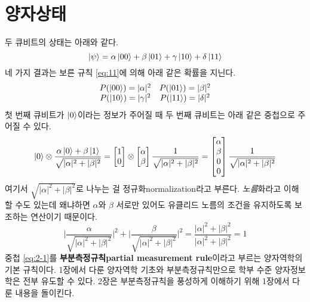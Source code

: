 \documentclass[a4paper,chapter,atbegshi]{oblivoir}
\begin{document}
\chapter{양자상태}
두 큐비트의 상태는 아래와 같다. 
\[
  \ket{\psi} = \alpha\ket{00}+\beta\ket{01}+\gamma\ket{10}+\delta\ket{11}
\]
네 가지 결과는 보른 규칙 \ref{eq:11}에 의해 아래 같은 확률을 지닌다. 
\[\begin{matrix}
  P(\ket{00})=|\alpha|^2 & P(\ket{01})=|\beta|^2 \\
  P(\ket{10})=|\gamma|^2 & P(\ket{11})=|\delta|^2
\end{matrix}\]
첫 번째 큐비트가 $\ket{0}$이라는 정보가 주어질 때 두 번째 큐비트는 아래
같은 중첩으로 주어질 수 있다.
\begin{equation}\label{eq:2-1}
  \ket0\otimes\frac{\alpha\ket0+\beta\ket1}{\sqrt{|\alpha|^2+|\beta|^2}}
  = \begin{bmatrix}1\\0\end{bmatrix}\otimes
  \begin{bmatrix}\alpha\\\beta\end{bmatrix}\frac{1}{\sqrt{|\alpha|^2+|\beta|^2}}
  = \begin{bmatrix}\alpha\\\beta\\0\\0\end{bmatrix}\frac{1}{\sqrt{|\alpha|^2+|\beta|^2}}
\end{equation}
여기서 $\sqrt{|\alpha|^2+|\beta|^2}$로 나누는 걸 정규화{\tiny normalization}라고
부른다. \emph{노름}화라고 이해할 수도 있는데 왜냐하면 $\alpha$와 $\beta$ 서로만
있어도 유클리드 노름의 조건을 유지하도록 보조하는 연산이기 때문이다. 
\[
  \Bigg\lvert\frac{\alpha}{\sqrt{|\alpha|^2+|\beta|^2}}\Bigg\rvert^2 +
  \Bigg\lvert\frac{\beta}{\sqrt{|\alpha|^2+|\beta|^2}}\Bigg\rvert^2
  =
  \frac{|\alpha|^2+|\beta|^2}{|\alpha|^2+|\beta|^2}=1
\]
중첩 \ref{eq:2-1}를 \textbf{부분측정규칙\tiny partial measurement rule}이라고
부르는 양자역학의 기본 규칙이다. 1장에서 다룬 양자역학 기초와 부분측정규칙만으로
학부 수준 양자정보학은 전부 유도할 수 있다. 2장은 부분측정규칙을 풍성하게
이해하기 위해 1장에서 다룬 내용을 돌이킨다. 
\end{document}
